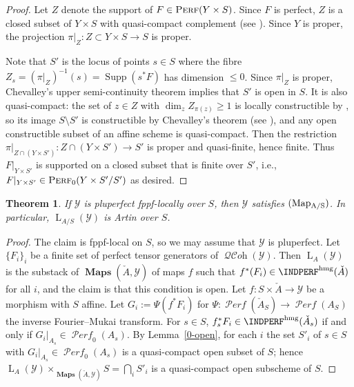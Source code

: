 \documentclass[12pt, oneside]{amsart}
\numberwithin{equation}{section}
\newtheorem{theorem}[subsubsection]{Theorem}
\theoremstyle{remark}
\theoremstyle{plain}
\renewcommand{\ge}{\geqslant}
\renewcommand{\le}{\leqslant}
\DeclareMathOperator{\QCOH}{\mathcal{QC}\textit{oh}}
\DeclareMathOperator{\Perf}{\textsc{Perf}}
\DeclareMathOperator{\PERF}{\mathcal{P}\textit{erf}}
\DeclareMathOperator{\MAP}{\mathbf{Maps}}
\newcommand{\Loop}{\operatorname{L}}
\newcommand{\YY}{\mathcal{Y}}
\begin{document}
\begin{proof}
Let $Z$ denote the support of $F \in \Perf(Y\times S)$. Since $F$ is perfect, $Z$ is a closed subset of $Y \times S$ with quasi-compact complement (see \cite[Lem.~3.3]{ThomasonClassification}). Since $Y$ is proper, the projection $\pi|_Z: Z \subset Y \times S \to S$ is proper.

Note that $S'$ is the locus of points $s \in S$ where the fibre $Z_s = (\pi|_Z)^{-1}(s) = \operatorname{Supp}(s^* F)$ has dimension $\le 0$.
Since $\pi|_Z$ is proper, Chevalley's upper semi-continuity theorem implies that $S'$ is open in $S$.
It is also quasi-compact: the set of $z \in Z$ with $\dim_z Z_{\pi(z)} \ge 1$ is locally constructible by \cite[IV$_3$, Prop.~9.9.1(i)]{EGA}, so its image $S \setminus S'$ is constructible by Chevalley's theorem (see \cite[IV$_1$, Thm.~1.8.4]{EGA}), and any open constructible subset of an affine scheme is quasi-compact.
Then the restriction $\pi|_{Z \cap (Y \times S')} : Z \cap (Y \times S') \to S'$ is proper and quasi-finite, hence finite.
Thus $F|_{Y \times S'}$ is supported on a closed subset that is finite over $S'$, i.e., $F|_{Y \times S'} \in \Perf_{0}(Y\times S'/S')$ as desired.
\end{proof}

\begin{theorem}\label{open in map pluperfect} If $\YY$ is pluperfect fppf-locally over $S$, then $\YY$ satisfies $(\textup{Map}\textsubscript{A/S})$. In particular, $\Loop_{A/S}(\YY)$ is Artin over $S$. \end{theorem}

\begin{proof}
  The claim is fppf-local on $S$, so we may assume that $\YY$ is pluperfect.
  Let $\{F_i\}_i$ be a finite set of perfect tensor generators of $\QCOH(\YY)$.
  Then $\Loop_A(\YY)$ is the substack of $\MAP(\check{A}, \YY)$ of maps $f$ such that $f^*(F_i) \in \INDPERF^{\mathrm{hmg}}(\check{A})$ for all $i$, and the claim is that this condition is open.
  Let $f : S \times \check{A} \to \YY$ be a morphism with $S$ affine.
  Let $G_i := \Psi(f^* F_i)$ for $\Psi : \PERF(\check{A}_S) \to \PERF(A_S)$ the inverse Fourier--Mukai transform.
  For $s \in S$, $f_s^* F_i \in \INDPERF^{\mathrm{hmg}}(\check{A}_{s})$ if and only if $G_i|_{A_s} \in \PERF_0(A_{s})$.
  By Lemma~\ref{0-open}, for each $i$ the set $S'_i$ of $s \in S$ with $G_i|_{A_s} \in \PERF_0(A_s)$ is a quasi-compact open subset of $S$; hence $\Loop_A(\YY) \times_{\MAP(\check{A}, \YY)} S = \bigcap_i S'_i$ is a quasi-compact open subscheme of $S$.
\end{proof}
\end{document}
